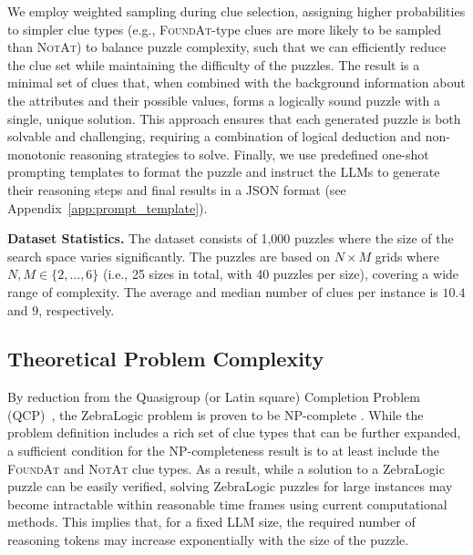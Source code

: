 We employ weighted sampling during clue selection, assigning higher probabilities to simpler clue types (e.g., \textsc{FoundAt}-type clues are more likely to be sampled than \textsc {NotAt}) to balance puzzle complexity, such that we can efficiently reduce the clue set while maintaining the difficulty of the puzzles.
The result is a minimal set of clues that, when combined with the background information about the attributes and their possible values, forms a logically sound puzzle with a single, unique solution.
This approach ensures that each generated puzzle is both solvable and challenging, requiring a combination of logical deduction and non-monotonic reasoning strategies to solve.
Finally, we use predefined one-shot prompting templates to format the puzzle and instruct the LLMs to generate their reasoning steps and final results in a JSON format (see Appendix~\ref{app:prompt_template}).

\textbf{Dataset Statistics.}
The dataset consists of 1,000 puzzles where the size of the search space varies significantly. The puzzles are based on $N \times M$ grids where $N,M \in \{2,...,6\}$ (i.e., 25 sizes in total, with 40 puzzles per size), covering a wide range of complexity. The average and median number of clues per instance is $10.4$ and $9$, respectively. %




\subsection{Theoretical Problem Complexity} 
\label{ssec:problem_complexity}

By reduction from the Quasigroup (or Latin square) Completion Problem (QCP)~\citep{Colbourn1984TheCO,Gomes2002CompletingQO}, the ZebraLogic problem is proven to be NP-complete \citep{Sempolinski2009AutomaticSO}. While the problem definition includes a rich set of clue types that can be further expanded, a sufficient condition for the NP-completeness result is to at least include the \textsc{FoundAt} and \textsc{NotAt} clue types. As a result, while a solution to a ZebraLogic puzzle can be easily verified, solving ZebraLogic puzzles for large instances may become intractable within reasonable time frames using current computational methods. This implies that, for a fixed LLM size, the required number of reasoning tokens may increase exponentially with the size of the puzzle.



